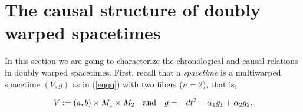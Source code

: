 \section{The causal structure of doubly warped spacetimes}
\label{sec:chronologicalrelation}
%

In this section we are going to characterize the chronological and causal relations in doubly warped spacetimes. First, recall that a {\em \multiwarped spacetime} is a multiwarped spacetime $(V,g)$ as in (\ref{eqqq}) with two fibers ($n=2$), that is,

\begin{equation}
  \label{eq:1-aux}
  V:= (a,b)\times M_{1} \times M_{2}\quad\hbox{and}\quad
g=-dt^{2}+\alpha_{1}g_{1}+\alpha_{2}g_{2}.
\end{equation}




